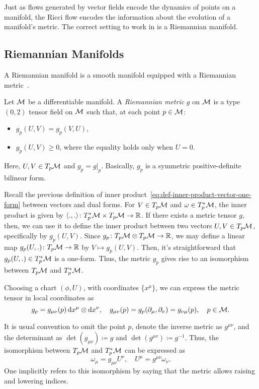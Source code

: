 Just as flows generated by vector fields encode the dynamics of points on a manifold, the Ricci flow encodes the information about the evolution of a manifold's metric. The correct setting to work in is a Riemannian manifold. 


\subsection{Riemannian Manifolds}
A Riemannian manifold is a smooth manifold equipped with a Riemannian metric~\cite{lee:riemann}.

\begin{definition}
	Let $\mathcal{M}$ be a differentiable manifold. A \emph{Riemannian metric} $g$ on $\mathcal{M}$ is a type $(0,2)$ tensor field on $\mathcal{M}$ such that, at each point $p \in \mathcal{M}$:
	\begin{itemize}
		\item $g_p (U,V) = g_p (V,U)$,
		\item $g_p(U,V) \geq 0$, where the equality holds only when $U=0$.
	\end{itemize}
	Here, $U,V \in T_p \mathcal{M}$ and $g_p = g|_p$. Basically, $g_p$ is a symmetric positive-definite bilinear form.
\end{definition}

Recall the previous definition of inner product~\eqref{eq:def-inner-product-vector-one-form} between vectors and dual forms. For $V \in T_p \mathcal{M}$ and $\omega \in T^*_p \mathcal{M}$, the inner product is given by $\langle ., . \rangle \colon T^*_p \mathcal{M} \times T_p \mathcal{M} \to \mathbb{R}$. If there exists a metric tensor $g$, then, we can use it to define the inner product between two vectors $U,V \in T_p \mathcal{M}$, specifically by $g_p(U,V)$. Since $g_p \colon T_p \mathcal{M} \otimes T_p \mathcal{M} \to \mathbb{R}$, we may define a linear map $g_p(U,.) \colon T_p \mathcal{M} \to \mathbb{R}$ by $V \mapsto g_p(U,V)$. Then, it's straightforward that $g_p(U,.) \in T^*_p \mathcal{M}$ is a one-form. Thus, the metric $g_p$ gives rise to an isomorphism between $T_p \mathcal{M}$ and $T^*_p \mathcal{M}$.

Choosing a chart $(\phi,U)$, with coordinates $\{ x^\mu \}$, we can express the metric tensor in local coordinates as
\begin{equation}
	g_p = g_{\mu\nu}(p) \mathop{}\!\mathrm{d} x^\mu \otimes \mathop{}\!\mathrm{d} x^\nu, \quad g_{\mu\nu}(p) = g_p (\partial_\mu, \partial_\nu) = g_{\nu\mu}(p), \quad p \in \mathcal{M}.
\end{equation}

It is usual convention to omit the point $p$, denote the inverse metric as $g^{\mu\nu}$, and the determinant as $\det(g_{\mu\nu}) \coloneq g$ and $\det(g^{\mu\nu}) \coloneq g^{-1}$. Thus, the isomorphism between $T_p \mathcal{M}$ and $T^*_p \mathcal{M}$ can be expressed as
\begin{equation}
	\omega_\mu = g_{\mu\nu} U^\nu, \quad U^\mu = g^{\mu\nu} \omega_\nu .
\end{equation}
One implicitly refers to this isomorphism by saying that the metric allows raising and lowering indices.

